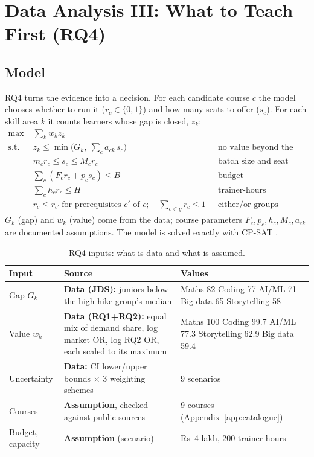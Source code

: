 \section{Data Analysis III: What to Teach First (RQ4)}\label{sec:rq4}

\subsection{Model}

RQ4 turns the evidence into a decision. For each candidate course $c$ the model chooses whether to
run it ($r_c \in \{0,1\}$) and how many seats to offer ($s_c$). For each skill area $k$ it counts
learners whose gap is closed, $z_k$:
\begin{align*}
\max \; & \textstyle\sum_k w_k z_k \\
\text{s.t. } & z_k \le \min\!\big(G_k,\ \textstyle\sum_c a_{ck}\, s_c\big) && \text{no value beyond the gap}\\
& m_c r_c \le s_c \le M_c r_c && \text{batch size and seat limits}\\
& \textstyle\sum_c (F_c r_c + p_c s_c) \le B && \text{budget}\\
& \textstyle\sum_c h_c r_c \le H && \text{trainer-hours}\\
& r_c \le r_{c'} \ \text{for prerequisites } c' \text{ of } c; \quad \textstyle\sum_{c\in g} r_c \le 1 && \text{either/or groups}
\end{align*}
$G_k$ (gap) and $w_k$ (value) come from the data; course parameters $F_c, p_c, h_c, M_c, a_{ck}$ are
documented assumptions. The model is solved exactly with CP-SAT \citep{cpsat}.

\begin{table}[H]\centering\small
\caption{RQ4 inputs: what is data and what is assumed.}\label{tab:rq4in}
\begin{tabularx}{\linewidth}{@{}L{3.1cm}L{4.6cm}Y@{}}
\toprule
Input & Source & Values \\
\midrule
Gap $G_k$ & \textbf{Data (JDS):} juniors below the high-hike group's median & Maths 82 \textbullet{} Coding 77 \textbullet{} AI/ML 71 \textbullet{} Big data 65 \textbullet{} Storytelling 58\\
Value $w_k$ & \textbf{Data (RQ1+RQ2):} equal mix of demand share, log market OR, log RQ2 OR, each scaled to its maximum & Maths 100 \textbullet{} Coding 99.7 \textbullet{} AI/ML 77.3 \textbullet{} Storytelling 62.9 \textbullet{} Big data 59.4\\
Uncertainty & \textbf{Data:} CI lower/upper bounds $\times$ 3 weighting schemes & 9 scenarios\\
Courses & \textbf{Assumption}, checked against public sources & 9 courses (Appendix~\ref{app:catalogue})\\
Budget, capacity & \textbf{Assumption} (scenario) & Rs~4 lakh, 200 trainer-hours\\
\bottomrule
\end{tabularx}
\end{table}


